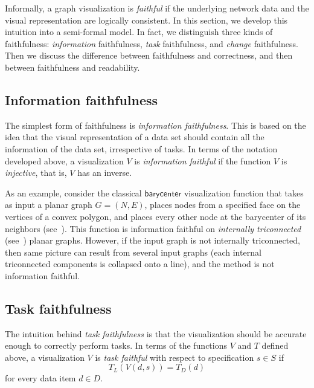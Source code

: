 \documentclass[10pt,journal,cspaper,compsoc]{IEEEtran}
\newcommand{\barycenter}{\textsf{barycenter}}
\begin{document}
Informally, a graph visualization is {\em faithful} if the underlying
network data and the visual representation are logically consistent.
In this section, we develop this intuition into a semi-formal model. In
fact, we distinguish three kinds of faithfulness: \emph{information}
faithfulness, \emph{task} faithfulness, and \emph{change}
faithfulness. Then we discuss the difference between faithfulness and correctness, and then between faithfulness and readability.

\subsection{Information faithfulness}
The simplest form of faithfulness is \emph{information faithfulness}.
This is based on the idea that the visual representation of a data set
should contain all the information of the data set, irrespective of
tasks. In terms of the notation developed above, a visualization $V$
is \emph{information faithful} if the function $V$ is \emph{injective}, that
is, $V$ has an inverse.

As an example, consider the classical $\barycenter$ visualization function that takes as input a planar graph $G=(N,E)$, places nodes from a specified face on the vertices of a convex polygon, and places every other node at the barycenter of its neighbors (see~\cite{tamassia2013handbook}). This function is information faithful on \emph{internally triconnected} (see~\cite{tamassia2013handbook}) planar graphs. However, if the input graph is not internally triconnected, then same picture can result from several input graphs (each internal triconnected components is collapsed onto a line), and the method is not information faithful.


\begin{comment}
For an example, consider a visualization function
\texttt{extractPlanar} that takes a graph $G$ as input, extracts a
maximal planar subgraph $G^-$ of $G$, and draws $G^-$ using standard
planar graph drawing algorithms. The output is readable, since it
avoids edge crossings. However, it is not faithful, because the
mapping is not one-one: many graphs have the same maximal planar
subgraph.
\end{comment}


\subsection{Task faithfulness}
The intuition behind \emph{task faithfulness} is that the
visualization should be accurate enough to correctly perform tasks. In
terms of the functions $V$ and $T$ defined above, a visualization $V$ is \emph{task
faithful} with respect to specification $s \in S$ if
\begin{equation}
T_L( V (d, s)) = T_D(d)
\end{equation}
for every data item $d \in D$.
\end{document}
